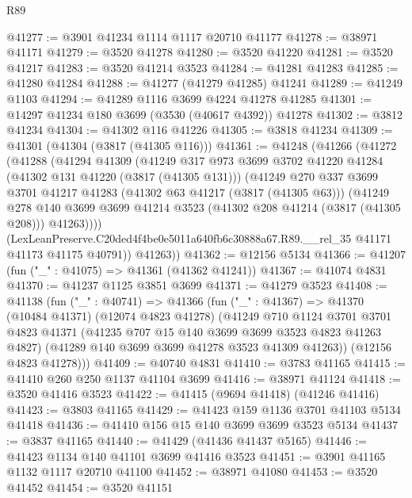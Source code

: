 \begin{lexlean}{R89}
\begin{coremodule}
@41277 := @3901 @41234 @1114 @1117 @20710 @41177
@41278 := @38971 @41171
@41279 := @3520 @41278
@41280 := @3520 @41220
@41281 := @3520 @41217
@41283 := @3520 @41214 @3523
@41284 := @41281 @41283
@41285 := @41280 @41284
@41288 := @41277 (@41279 @41285) @41241
@41289 := @41249 @1103
@41294 := @41289 @1116 @3699 @4224 @41278 @41285
@41301 := @14297 @41234 @180 @3699 (@3530 (@40617 @4392)) @41278
@41302 := @3812 @41234
@41304 := @41302 @116 @41226
@41305 := @3818 @41234
@41309 := @41301 (@41304 (@3817 (@41305 @116)))
@41361 := @41248
    (@41266
      (@41272
        (@41288
          (@41294
            @41309
            (@41249
              @317
              @973
              @3699
              @3702
              @41220
              @41284
              (@41302 @131 @41220 (@3817 (@41305 @131)))
              (@41249
                @270
                @337
                @3699
                @3701
                @41217
                @41283
                (@41302 @63 @41217 (@3817 (@41305 @63)))
                (@41249
                  @278
                  @140
                  @3699
                  @3699
                  @41214
                  @3523
                  (@41302 @208 @41214 (@3817 (@41305 @208)))
                  @41263))))
          (LexLeanPreserve.C20ded4f4be0e5011a640fb6c30888a67.R89.__rel_35
            @41171
            @41173
            @41175
            @40791))
        @41263))
@41362 := @12156 @5134
@41366 := @41207 (fun ("_" : @41075) => @41361 (@41362 @41241))
@41367 := @41074 @4831
@41370 := @41237 @1125 @3851 @3699
@41371 := @41279 @3523
@41408 := @41138
    (fun ("_" : @40741) =>
    @41366
      (fun ("_" : @41367) =>
      @41370
        (@10484 @41371)
        (@12074 @4823 @41278)
        (@41249
          @710
          @1124
          @3701
          @3701
          @4823
          @41371
          (@41235 @707 @15 @140 @3699 @3699 @3523 @4823 @41263 @4827)
          (@41289 @140 @3699 @3699 @41278 @3523 @41309 @41263))
        (@12156 @4823 @41278)))
@41409 := @40740 @4831
@41410 := @3783 @41165
@41415 := @41410 @260 @250 @1137 @41104 @3699
@41416 := @38971 @41124
@41418 := @3520 @41416 @3523
@41422 := @41415 (@9694 @41418) (@41246 @41416)
@41423 := @3803 @41165
@41429 := @41423 @159 @1136 @3701 @41103 @5134 @41418
@41436 := @41410 @156 @15 @140 @3699 @3699 @3523 @5134
@41437 := @3837 @41165
@41440 := @41429 (@41436 @41437 @5165)
@41446 := @41423 @1134 @140 @41101 @3699 @41416 @3523
@41451 := @3901 @41165 @1132 @1117 @20710 @41100
@41452 := @38971 @41080
@41453 := @3520 @41452
@41454 := @3520 @41151

\end{coremodule}
\end{lexlean}
